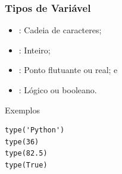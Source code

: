 \documentclass{beamer}
\begin{document}
\begin{frame}[fragile]
\frametitle{Tipos de Variável}

\begin{itemize}
	\item {} : Cadeia de caracteres;
	\item {} : Inteiro;
	\item {} : Ponto flutuante ou real; e
	\item {} : Lógico ou booleano.
\end{itemize}\vfill

\begin{exampleblock}{Exemplos}
\begin{lstlisting}
type('Python')
type(36)
type(82.5)
type(True)
\end{lstlisting}
\end{exampleblock}
\end{frame}
\end{document}
